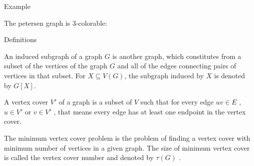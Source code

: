 \documentclass{beamer}
\begin{document}
\begin{frame}{Example}
\begin{example}
The petersen graph is $3$-colorable:

\begin{center}
\end{center}
\end{example}
\end{frame}

\begin{frame}{Definitions}
\begin{definition}
An \color{red} induced subgraph \color{black} of a graph $G$ is another graph, which constitutes from a subset of the vertices of the graph $G$ and all of the edges connecting pairs of vertices in that subset. For $X \subseteq V(G)$, the subgraph induced by $X$ is denoted by $G[X]$.
\end{definition}

\begin{definition}
A \color{red} vertex cover \color{black} $V'$ of a graph is a subset of $V$ such that for every edge $uv \in E$ , $u \in V'$ or $v \in V'$ , that means every edge has at least one endpoint in the vertex cover. 
\end{definition}
\begin{definition}
The \color{red} minimum vertex cover \color{black} problem is the problem of finding a vertex  cover with minimum number of vertices in a given graph. The size of minimum vertex cover is called the vertex cover number and denoted by $\tau(G)$ .
\end{definition}
\end{frame}
\end{document}
